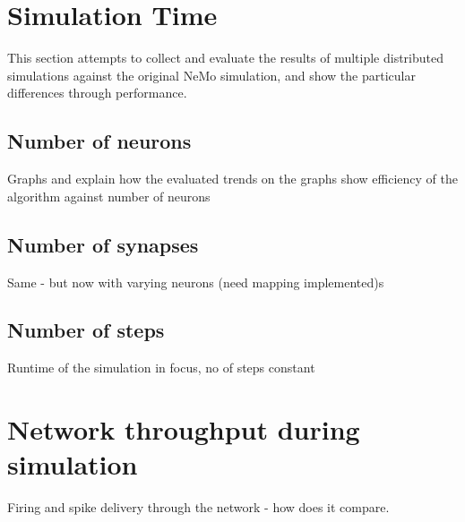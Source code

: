 \section{Simulation Time}

This section attempts to collect and evaluate the results of multiple distributed simulations against the original NeMo simulation, and show the particular differences through performance.

\subsection{Number of neurons}

Graphs and explain how the evaluated trends on the graphs show efficiency of the algorithm against number of neurons

\subsection{Number of synapses}

Same - but now with varying neurons (need mapping implemented)s

\subsection{Number of steps}

Runtime of the simulation in focus, no of steps constant

\section{Network throughput during simulation}

Firing and spike delivery through the network - how does it compare.
